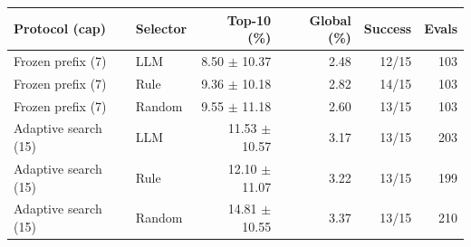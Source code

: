 \begin{tabular}{llrrrr}
\toprule
Protocol (cap) & Selector & Top-10 (\%) & Global (\%) & Success & Evals \\
\midrule
Frozen prefix (7) & LLM & 8.50 $\pm$ 10.37 & 2.48 & 12/15 & 103 \\
Frozen prefix (7) & Rule & 9.36 $\pm$ 10.18 & 2.82 & 14/15 & 103 \\
Frozen prefix (7) & Random & 9.55 $\pm$ 11.18 & 2.60 & 13/15 & 103 \\
Adaptive search (15) & LLM & 11.53 $\pm$ 10.57 & 3.17 & 13/15 & 203 \\
Adaptive search (15) & Rule & 12.10 $\pm$ 11.07 & 3.22 & 13/15 & 199 \\
Adaptive search (15) & Random & 14.81 $\pm$ 10.55 & 3.37 & 13/15 & 210 \\
\bottomrule
\end{tabular}
